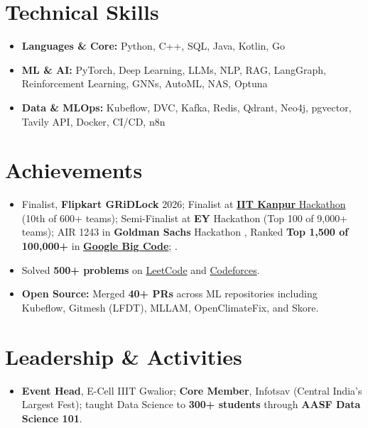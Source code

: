 \documentclass[letterpaper,11pt]{article}
\begin{document}
\section{Technical Skills}
{\footnotesize
\begin{itemize}[label=--, leftmargin=0.2in, itemsep=0pt, topsep=1pt]
  \item \textbf{Languages \& Core:} Python, C++, SQL, Java, Kotlin, Go
  \item \textbf{ML \& AI:} PyTorch, Deep Learning, LLMs, NLP, RAG, LangGraph, Reinforcement Learning, GNNs, AutoML, NAS, Optuna
  \item \textbf{Data \& MLOps:} Kubeflow, DVC, Kafka, Redis, Qdrant, Neo4j, pgvector, Tavily API, Docker, CI/CD, n8n
\end{itemize}
}

\section{Achievements}
{\footnotesize
\begin{itemize}[leftmargin=0.15in, label=\textbullet, itemsep=2pt, topsep=1pt]
  \item Finalist, \textbf{Flipkart GRiDLock} 2026; Finalist at \href{https://drive.google.com/file/d/14Hq7lurUI6fCBCNJXnK_vKUqB5ojXl__/view?usp=drive_link}{\textbf{IIT Kanpur} Hackathon} (10th of 600+ teams); Semi-Finalist at \textbf{EY} Hackathon (Top 100 of 9,000+ teams); AIR 1243 in \textbf{Goldman Sachs} Hackathon , Ranked \textbf{Top 1,500 of 100,000+} in \href{https://www.linkedin.com/in/sneh-kansagara-b61362312/overlay/Certifications/1803360977/treasury/?profileId=ACoAAE9uPfkBP-I8YnukmQUjkkoGygXSvywC8q8}{\textbf{Google Big Code}}; .
  \item  Solved \textbf{500+ problems} on \href{https://leetcode.com/u/Oscar2007/}{LeetCode} and \href{https://codeforces.com/profile/Sharkyi}{Codeforces}.

  \item \textbf{Open Source:} Merged \textbf{40+ PRs} across ML repositories including Kubeflow, Gitmesh (LFDT), MLLAM, OpenClimateFix, and Skore.

\end{itemize}
}

\section{Leadership \& Activities}
{\footnotesize
\begin{itemize}[leftmargin=0.15in, label=\textbullet, itemsep=0pt, topsep=1pt]
  \item \textbf{Event Head}, E-Cell IIIT Gwalior; \textbf{Core Member}, Infotsav (Central India's Largest Fest); taught Data Science to \textbf{300+ students} through \textbf{AASF Data Science 101}.
\end{itemize}
}
\end{document}
